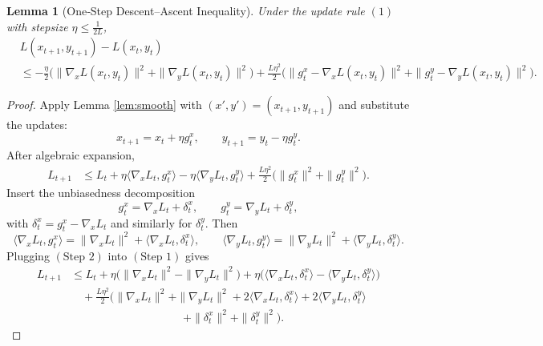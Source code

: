 \documentclass{article}
\newtheorem{lemma}{Lemma}
\begin{document}
\begin{lemma}[One‑Step Descent–Ascent Inequality]\label{lem:one-step}
Under the update rule \((1)\) with stepsize \(\eta\le \frac{1}{2L}\),
\[
\begin{aligned}
&L(x_{t+1},y_{t+1}) - L(x_{t},y_{t}) \\
&\le -\frac{\eta}{2}\Big(\|\nabla_{x}L(x_{t},y_{t})\|^{2}
                     +\|\nabla_{y}L(x_{t},y_{t})\|^{2}\Big)
   +\frac{L\eta^{2}}{2}\Big(\|g^{x}_{t}-\nabla_{x}L(x_{t},y_{t})\|^{2}
                     +\|g^{y}_{t}-\nabla_{y}L(x_{t},y_{t})\|^{2}\Big).
\tag{L2}
\end{aligned}
\]
\end{lemma}
\begin{proof}
Apply Lemma \ref{lem:smooth} with \((x',y')=(x_{t+1},y_{t+1})\) and substitute the updates:
\[
x_{t+1}=x_{t}+\eta g^{x}_{t},\qquad
y_{t+1}=y_{t}-\eta g^{y}_{t}.
\]
After algebraic expansion,
\[
\begin{aligned}
L_{t+1}&\le L_{t}
        +\eta\langle\nabla_{x}L_{t},g^{x}_{t}\rangle
        -\eta\langle\nabla_{y}L_{t},g^{y}_{t}\rangle
        +\frac{L\eta^{2}}{2}\big(\|g^{x}_{t}\|^{2}+\|g^{y}_{t}\|^{2}\big) .
\end{aligned}
\tag{Step 1}
\]
Insert the unbiasedness decomposition
\[
g^{x}_{t}= \nabla_{x}L_{t}+ \delta^{x}_{t},\qquad
g^{y}_{t}= \nabla_{y}L_{t}+ \delta^{y}_{t},
\]
with \(\delta^{x}_{t}=g^{x}_{t}-\nabla_{x}L_{t}\) and similarly for \(\delta^{y}_{t}\).  
Then
\[
\langle\nabla_{x}L_{t},g^{x}_{t}\rangle
   =\|\nabla_{x}L_{t}\|^{2}+\langle\nabla_{x}L_{t},\delta^{x}_{t}\rangle,
\qquad
\langle\nabla_{y}L_{t},g^{y}_{t}\rangle
   =\|\nabla_{y}L_{t}\|^{2}+\langle\nabla_{y}L_{t},\delta^{y}_{t}\rangle .
\tag{Step 2}
\]
Plugging \((\text{Step 2})\) into \((\text{Step 1})\) gives
\[
\begin{aligned}
L_{t+1}&\le L_{t}
        +\eta\Big(\|\nabla_{x}L_{t}\|^{2}
                 -\|\nabla_{y}L_{t}\|^{2}\Big)
        +\eta\Big(\langle\nabla_{x}L_{t},\delta^{x}_{t}\rangle
                 -\langle\nabla_{y}L_{t},\delta^{y}_{t}\rangle\Big) \\
      &\quad+\frac{L\eta^{2}}{2}\Big(\|\nabla_{x}L_{t}\|^{2}
                 +\|\nabla_{y}L_{t}\|^{2}
                 +2\langle\nabla_{x}L_{t},\delta^{x}_{t}\rangle
                 +2\langle\nabla_{y}L_{t},\delta^{y}_{t}\rangle \\
      &\qquad\qquad\qquad\qquad\qquad
                 +\|\delta^{x}_{t}\|^{2}
                 +\|\delta^{y}_{t}\|^{2}\Big).
\end{aligned}
\]
\end{proof}
\end{document}
